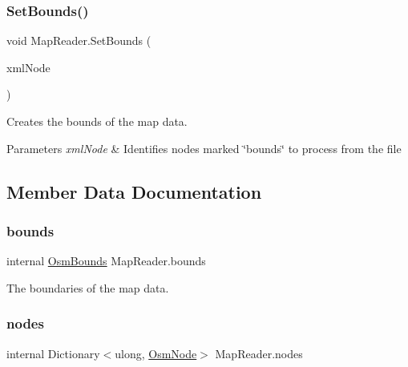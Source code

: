 \subsubsection{\texorpdfstring{SetBounds()}{SetBounds()}}
{\footnotesize\ttfamily void Map\+Reader.\+Set\+Bounds (\begin{DoxyParamCaption}\item[{Xml\+Node}]{xml\+Node }\end{DoxyParamCaption})\hspace{0.3cm}{\ttfamily [private]}}



Creates the bounds of the map data. 


\begin{DoxyParams}{Parameters}
{\em xml\+Node} & Identifies nodes marked \char`\"{}bounds\char`\"{} to process from the file\\
\hline
\end{DoxyParams}


\subsection{Member Data Documentation}
\mbox{\label{class_map_reader_a9cc55dac60d0505e98e0161f8cf103ec}} 
\subsubsection{\texorpdfstring{bounds}{bounds}}
{\footnotesize\ttfamily internal \mbox{\hyperlink{class_osm_bounds}{Osm\+Bounds}} Map\+Reader.\+bounds\hspace{0.3cm}{\ttfamily [private]}}



The boundaries of the map data. 

\mbox{\label{class_map_reader_a78e9d00aa1f8cb21772e2f9453002d8e}} 
\subsubsection{\texorpdfstring{nodes}{nodes}}
{\footnotesize\ttfamily internal Dictionary$<$ulong, \mbox{\hyperlink{class_osm_node}{Osm\+Node}}$>$ Map\+Reader.\+nodes\hspace{0.3cm}{\ttfamily [private]}}



